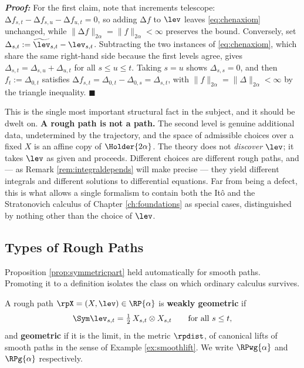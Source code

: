 \textbf{\textit{Proof:}} For the first claim, note that increments telescope: $\increment{f}_{s,t} -
\increment{f}_{s,u} - \increment{f}_{u,t} = 0$, so adding $\increment{f}$ to $\lev$ leaves
\eqref{eq:chenaxiom} unchanged, while $\lVert\increment{f}\rVert_{2\alpha} = \lVert f\rVert_{2\alpha}
< \infty$ preserves the bound. Conversely, set $\Delta_{s,t} := \widetilde\lev_{s,t} - \lev_{s,t}$.
Subtracting the two instances of \eqref{eq:chenaxiom}, which share the same right-hand side because
the first levels agree, gives $\Delta_{s,t} = \Delta_{s,u} + \Delta_{u,t}$ for all $s\leq u\leq t$.
Taking $s=u$ shows $\Delta_{s,s}=0$, and then $f_t := \Delta_{0,t}$ satisfies
$\increment{f}_{s,t} = \Delta_{0,t}-\Delta_{0,s} = \Delta_{s,t}$, with
$\lVert f\rVert_{2\alpha} = \lVert\Delta\rVert_{2\alpha} < \infty$ by the triangle inequality.
\hfill $\blacksquare$

\medskip

This is the single most important structural fact in the subject, and it should be dwelt on.
\textbf{A rough path is not a path.} The second level is genuine additional data, undetermined by
the trajectory, and the space of admissible choices over a fixed $X$ is an affine copy of
$\Holder{2\alpha}$. The theory does not \emph{discover} $\lev$; it takes $\lev$ as given and
proceeds. Different choices are different rough paths, and --- as Remark \ref{rem:integraldepends}
will make precise --- they yield different integrals and different solutions to differential
equations. Far from being a defect, this is what allows a single formalism to contain both the Itô
and the Stratonovich calculus of Chapter \ref{ch:foundations} as special cases, distinguished by nothing
other than the choice of $\lev$.

\subsection{Types of Rough Paths}\label{subsec:typesofrp}

Proposition \ref{prop:symmetricpart} held automatically for smooth paths. Promoting it to a
definition isolates the class on which ordinary calculus survives.

\begin{definition}\label{def:geometric}
A rough path $\rpX = (X,\lev) \in \RP{\alpha}$ is \textbf{weakly geometric} if
\begin{equation}\label{eq:weaklygeometric}
\Sym\lev_{s,t} = \tfrac12\, X_{s,t}\otimes X_{s,t} \qquad \text{for all } s \leq t ,
\end{equation}
and \textbf{geometric} if it is the limit, in the metric $\rpdist$, of canonical lifts of smooth
paths in the sense of Example \ref{ex:smoothlift}. We write $\RPwg{\alpha}$ and $\RPg{\alpha}$
respectively.
\end{definition}

